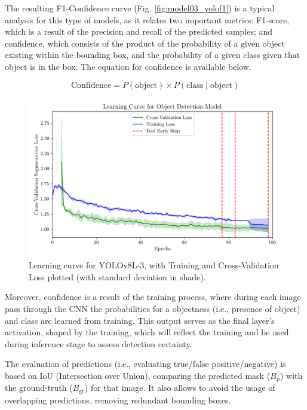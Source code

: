 \documentclass[conference]{IEEEtran}
\begin{document}
The resulting F1-Confidence curve (Fig. \ref{fig:model03_yolof1}) is a typical analysis for this type of models, as it relates two important metrics: F1-score, which is a result of the precision and recall of the predicted samples; and confidence, which consists of the product of the probability of a given object existing within the bounding box, and the probability of a given class given that object is in the box. The equation for confidence is available below.

\[
\text{Confidence} = P(\text{object}) \times P(\text{class} \mid \text{object})
\]

\begin{figure}[H]
    \centering
    \includegraphics[width=1\linewidth]{assets/model03_lc.png}
    \caption{Learning curve for YOLOv8L-3, with
Training and Cross-Validation Loss plotted (with standard
deviation in shade).}
    \label{fig:model03_lc}
\end{figure}





Moreover, confidence is a result of the training process, where during each image pass through the CNN the probabilities for a objectness (i.e., presence of object) and class are learned from training. This output serves as the final layer's activation, shaped by the training, which will reflect the training and be used during inference stage to assess detection certainty.

The evaluation of predictions (i.e., evaluating true/false positive/negative) is based on IoU (Intersection over Union), comparing the predicted mask ($B_{\text{p}}$) with the ground-truth ($B_{\text{gt}}$) for that image. It also allows to avoid the usage of overlapping predictions, removing redundant bounding boxes.
\end{document}
